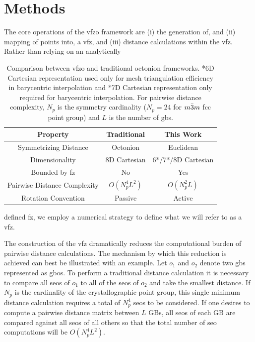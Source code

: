 \documentclass[final,twocolumn,12pt]{elsarticle}
\begin{document}
\section{Methods} \label{sec:methods}

The core operations of the \gls{vfzo} framework are (i) the generation of, and (ii) mapping of points into, a \gls{vfz}, and (iii) distance calculations within the \gls{vfz}. Rather than relying on an analytically
\begin{table}
\caption{Comparison between \acrlong{vfzo} and traditional octonion frameworks. *6D Cartesian representation used only for mesh triangulation efficiency in barycentric interpolation and *7D Cartesian representation only required for barycentric interpolation. For pairwise distance complexity, $N_p$ is the symmetry cardinality ($N_p=24$ for $m\Bar{3}m$ \gls{fcc} point group) and $L$ is the number of \glspl{gb}.}
\centering
\begin{tabular}{ccc}
\toprule
Property & Traditional & This Work \\
\midrule
Symmetrizing Distance & Octonion & Euclidean \\
Dimensionality & 8D Cartesian & 6*/7*/8D Cartesian \\
Bounded by \gls{fz} & No & Yes \\
Pairwise Distance Complexity & $O(N_p^4L^2)$ & $O(N_p^2L)$ \\
Rotation Convention & Passive & Active \\
\bottomrule
\end{tabular}
\label{tab:closed-mesh-comparison}
\end{table} 
defined \gls{fz}, we employ a numerical strategy to define what we will refer to as a \gls{vfz}.

The construction of the \gls{vfz} dramatically reduces the computational burden of pairwise distance calculations. The mechanism by which this reduction is achieved can best be illustrated with an example. Let $o_1$ and $o_2$ denote two \glspl{gb} represented as \glspl{gbo}. 
To perform a traditional distance calculation it is necessary to compare all \glspl{seo} of $o_1$ to all of the \glspl{seo} of $o_2$ and take the smallest distance. If $N_p$ is the cardinality of the crystallographic point group, this single minimum distance calculation requires a total of $N_p^4$ \glspl{seo} to be considered. If one desires to compute a pairwise distance matrix between $L$ GBs, all \glspl{seo} of each GB are compared against all \glspl{seo} of all others so that the total number of \gls{seo} computations will be $O(N_p^4L^2)$.
\end{document}
